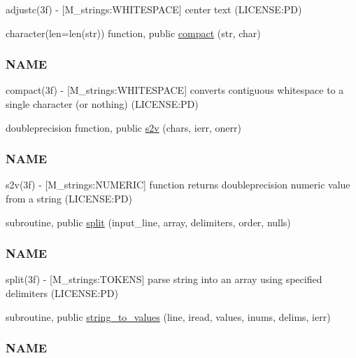 \begin{DoxyCompactItemize}
\begin{DoxyCompactList}
adjustc(3f) -\/ \mbox{[}M\+\_\+strings\+:W\+H\+I\+T\+E\+S\+P\+A\+CE\mbox{]} center text (L\+I\+C\+E\+N\+SE\+:PD) \end{DoxyCompactList}\item 
character(len=len(str)) function, public \mbox{\hyperlink{namespacem__time__duplicate_a20fc022f66383c65302e990c00432f38}{compact}} (str, char)
\begin{DoxyCompactList}\small\item\em \subsubsection*{N\+A\+ME}

compact(3f) -\/ \mbox{[}M\+\_\+strings\+:W\+H\+I\+T\+E\+S\+P\+A\+CE\mbox{]} converts contiguous whitespace to a single character (or nothing) (L\+I\+C\+E\+N\+SE\+:PD) \end{DoxyCompactList}\item 
doubleprecision function, public \mbox{\hyperlink{namespacem__time__duplicate_a118f0d70fa6f319fbd773008c7f86ef9}{s2v}} (chars, ierr, onerr)
\begin{DoxyCompactList}\small\item\em \subsubsection*{N\+A\+ME}

s2v(3f) -\/ \mbox{[}M\+\_\+strings\+:N\+U\+M\+E\+R\+IC\mbox{]} function returns doubleprecision numeric value from a string (L\+I\+C\+E\+N\+SE\+:PD) \end{DoxyCompactList}\item 
subroutine, public \mbox{\hyperlink{namespacem__time__duplicate_a326e0d62d92969a231864997eea2ab98}{split}} (input\+\_\+line, array, delimiters, order, nulls)
\begin{DoxyCompactList}\small\item\em \subsubsection*{N\+A\+ME}

split(3f) -\/ \mbox{[}M\+\_\+strings\+:T\+O\+K\+E\+NS\mbox{]} parse string into an array using specified delimiters (L\+I\+C\+E\+N\+SE\+:PD) \end{DoxyCompactList}\item 
subroutine, public \mbox{\hyperlink{namespacem__time__duplicate_a1bfa9e4483f2452c89c0388971bb21bd}{string\+\_\+to\+\_\+values}} (line, iread, values, inums, delims, ierr)
\begin{DoxyCompactList}\small\item\em \subsubsection*{N\+A\+ME}


\end{DoxyCompactList}
\end{DoxyCompactItemize}

